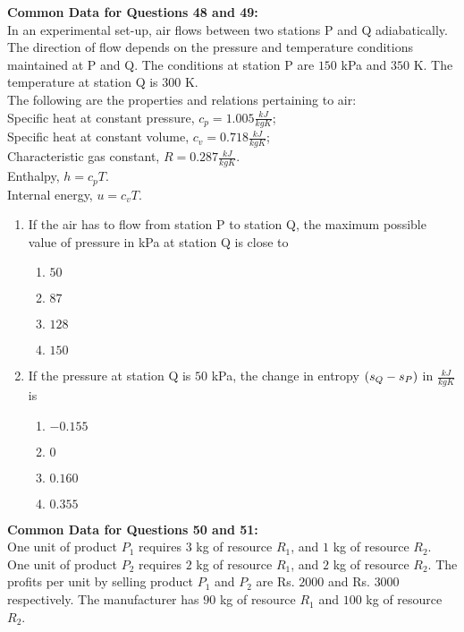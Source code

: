 \documentclass[journal,12pt,twocolumn]{IEEEtran}
\theoremstyle{remark}
\begin{document}
\begin{enumerate}[start=40]
\textbf{Common Data for Questions 48 and 49:}\\ 
In an experimental set-up, air flows between two stations P and Q adiabatically. The direction of flow depends on the pressure and temperature conditions maintained at P and Q. The conditions at station P are $150$ kPa and $350$ K. The temperature at station Q is $300$ K. \\
The following are the properties and relations pertaining to air: \\
Specific heat at constant pressure, $c_p = 1.005 \frac{ kJ}{kgK}$; \\
Specific heat at constant volume, $c_v = 0.718\frac{ kJ}{kgK}$; \\
Characteristic gas constant, $R = 0.287 \frac{kJ}{kgK}$. \\
Enthalpy, $h = c_p T$. \\
Internal energy, $u = c_v T$. 

\begin{enumerate}
    \item If the air has to flow from station P to station Q, the maximum possible value of pressure in kPa at station Q is close to
    \begin{enumerate}
        \item $50$
        \item $87$
        \item $128$
        \item $150$
    \end{enumerate}

    \item If the pressure at station Q is $50$ kPa, the change in entropy $\left(s_Q - s_P\right)$ in $\frac{kJ}{kgK}$ is
    \begin{enumerate}
        \item $-0.155$
        \item $0$
        \item $0.160$
        \item $0.355$
    \end{enumerate}
\end{enumerate}

\textbf{Common Data for Questions 50 and 51:} \\
One unit of product $P_1$ requires $3$ kg of resource $R_1$, and $1$ kg of resource $R_2$. One unit of product $P_2$ requires $2$ kg of resource $R_1$, and $2$ kg of resource $R_2$. The profits per unit by selling product $P_1$ and $P_2$ are Rs. $2000$ and Rs. $3000$ respectively. The manufacturer has $90$ kg of resource $R_1$ and $100$ kg of resource $R_2$.


\end{enumerate}
\end{document}

